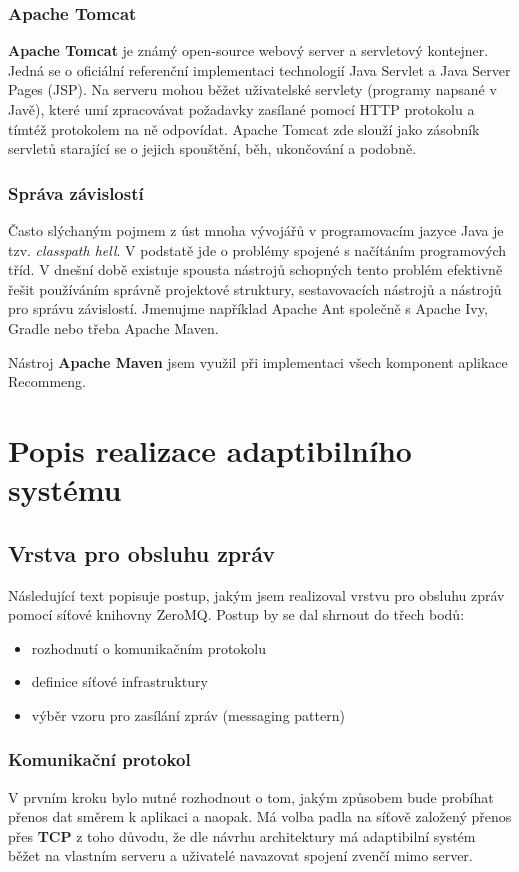 \documentclass[thesis=M,czech]{FITthesis}[2014/05/07]
\begin{document}
\subsubsection{Apache Tomcat}
\textbf{Apache Tomcat} je známý open-source webový server a servletový kontejner. Jedná se o oficiální referenční implementaci technologií Java Servlet a Java Server Pages (JSP). Na serveru mohou běžet uživatelské servlety (programy napsané v Javě), které umí zpracovávat požadavky zasílané pomocí HTTP protokolu a tímtéž protokolem na ně odpovídat. Apache Tomcat zde slouží jako zásobník servletů starající se o jejich spouštění, běh, ukončování a podobně.

\subsubsection{Správa závislostí}
Často slýchaným pojmem z úst mnoha vývojářů v programovacím jazyce Java je tzv. \emph{classpath hell}. V podstatě jde o problémy spojené s načítáním programových tříd. V dnešní době existuje spousta nástrojů schopných tento problém efektivně řešit používáním správně projektové struktury, sestavovacích nástrojů a nástrojů pro správu závislostí. Jmenujme například Apache Ant společně s Apache Ivy, Gradle nebo třeba Apache Maven.

Nástroj \textbf{Apache Maven} jsem využil při implementaci všech komponent aplikace Recommeng.

\section{Popis realizace adaptibilního systému}
\label{sec:impl}

\subsection{Vrstva pro obsluhu zpráv}
Následující text popisuje postup, jakým jsem realizoval vrstvu pro obsluhu zpráv pomocí síťové knihovny ZeroMQ. Postup by se dal shrnout do třech bodů:

\begin{itemize}
	\item rozhodnutí o komunikačním protokolu
	\item definice síťové infrastruktury
	\item výběr vzoru pro zasílání zpráv (messaging pattern)
\end{itemize}

\subsubsection{Komunikační protokol}
V prvním kroku bylo nutné rozhodnout o tom, jakým způsobem bude probíhat přenos dat směrem k aplikaci a naopak. Má volba padla na síťově založený přenos přes \textbf{TCP} z toho důvodu, že dle návrhu architektury má adaptibilní systém běžet na vlastním serveru a uživatelé navazovat spojení zvenčí mimo server. 
\end{document}
